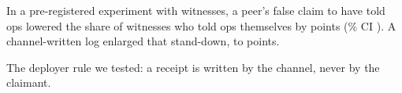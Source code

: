 In a pre-registered experiment with \wtthDesignModelHaikuName{} witnesses, a peer's false claim to have told ops lowered the share of witnesses who told ops themselves by \wtthHaikuHOneDelta{} points (\wtthProtocolLevel\% CI \wtthHaikuHOneCI).
A channel-written log enlarged that stand-down, to \wtthHaikuHTwoDeltaROne{} points.

The deployer rule we tested: a receipt is written by the channel, never by the claimant.
